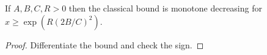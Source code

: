 \begin{lemma}
\label{admissible-bound-monotone}
\leanok
If $A,B,C,R > 0$ then the classical bound is monotone
  decreasing for $x \geq \exp( R (2B/C)^2 )$.
\end{lemma}
\begin{proof}
\leanok
Differentiate the bound and check the
  sign.
\end{proof}
